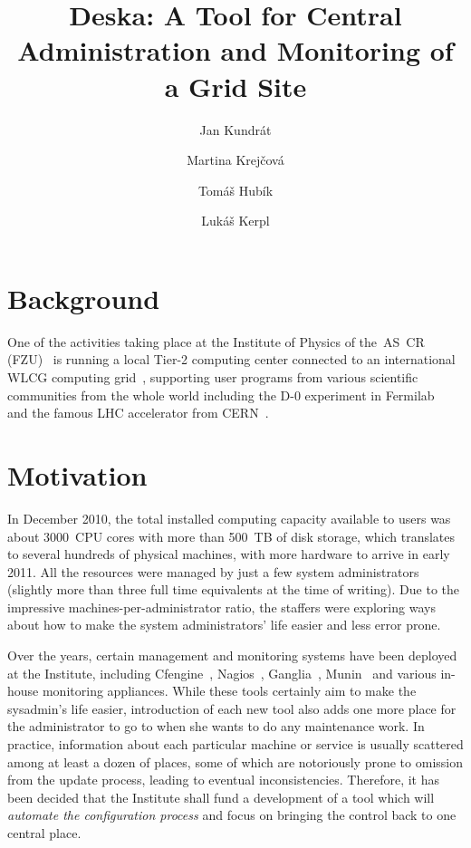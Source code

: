 \documentclass{article}
\begin{document}
\title{Deska: A Tool for Central Administration and Monitoring of a Grid Site}

\author{Jan Kundrát \and Martina Krejčová \and Tomáš Hubík \and Lukáš Kerpl}

\maketitle

\section{Background}

One of the activities taking place at the Institute of Physics of the~AS~CR (FZU)~\cite{fzu} is running a local Tier-2 computing
center connected to an international WLCG computing grid~\cite{wlcg}, supporting user programs from various scientific communities
from the whole world including the D-0 experiment in Fermilab~\cite{d0} and the famous LHC accelerator from CERN~\cite{lhc}.

\section{Motivation}

In December 2010, the total installed computing capacity available to users was about 3000~CPU cores with more than 500~TB of disk
storage, which translates to several hundreds of physical machines, with more hardware to arrive in early 2011.  All the resources
were managed by just a few system administrators (slightly more than three full time equivalents at the time of writing).  Due to the impressive
machines-per-administrator ratio, the staffers were exploring ways about how to make the system administrators' life easier and
less error prone.

Over the years, certain management and monitoring systems have been deployed at the Institute, including Cfengine~\cite{cfengine},
Nagios~\cite{nagios}, Ganglia~\cite{ganglia}, Munin~\cite{munin} and various in-house monitoring appliances.  While these tools
certainly aim to make the sysadmin's life easier, introduction of each new tool also adds one more place for the administrator to
go to when she wants to do any maintenance work.  In practice, information about each particular machine or service is
usually scattered among at least a dozen of places, some of which are notoriously prone to omission from the update process,
leading to eventual inconsistencies.  Therefore, it has been decided that the Institute shall fund a development of a tool which
will {\em automate the configuration process} and focus on bringing the control back to one central place.
\end{document}
